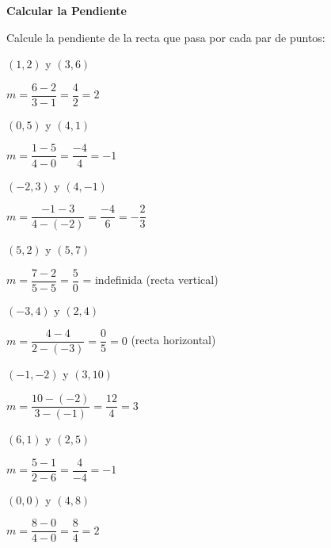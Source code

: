 \begin{exercise}
\textbf{Calcular la Pendiente}

Calcule la pendiente de la recta que pasa por cada par de puntos:

\problem $(1, 2)$ y $(3, 6)$

\begin{solucion}
$m = \dfrac{6 - 2}{3 - 1} = \dfrac{4}{2} = 2$
\end{solucion}

\problem $(0, 5)$ y $(4, 1)$

\begin{solucion}
$m = \dfrac{1 - 5}{4 - 0} = \dfrac{-4}{4} = -1$
\end{solucion}

\problem $(-2, 3)$ y $(4, -1)$

\begin{solucion}
$m = \dfrac{-1 - 3}{4 - (-2)} = \dfrac{-4}{6} = -\dfrac{2}{3}$
\end{solucion}

\problem $(5, 2)$ y $(5, 7)$

\begin{solucion}
$m = \dfrac{7 - 2}{5 - 5} = \dfrac{5}{0}$ = indefinida (recta vertical)
\end{solucion}

\problem $(-3, 4)$ y $(2, 4)$

\begin{solucion}
$m = \dfrac{4 - 4}{2 - (-3)} = \dfrac{0}{5} = 0$ (recta horizontal)
\end{solucion}

\problem $(-1, -2)$ y $(3, 10)$

\begin{solucion}
$m = \dfrac{10 - (-2)}{3 - (-1)} = \dfrac{12}{4} = 3$
\end{solucion}

\problem $(6, 1)$ y $(2, 5)$

\begin{solucion}
$m = \dfrac{5 - 1}{2 - 6} = \dfrac{4}{-4} = -1$
\end{solucion}

\problem $(0, 0)$ y $(4, 8)$

\begin{solucion}
$m = \dfrac{8 - 0}{4 - 0} = \dfrac{8}{4} = 2$
\end{solucion}
\end{exercise}


